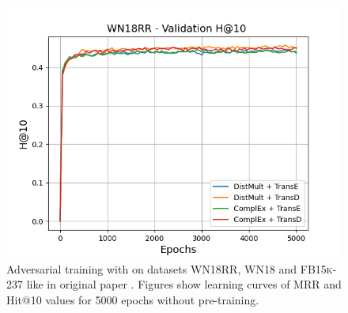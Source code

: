 \begin{figure}
\begin{minipage}{.3\textwidth}
      \includegraphics[width=0.9\linewidth]{figures/results/gan_train/not_pretrained/uncertainty/max_distribution/entropy/wn18rr/5k_epochs/uncertainty_wn18rr_hit10.png}
    \end{minipage}%
    \caption{Adversarial training with \ussoftmax on datasets \textsc{WN18RR}, \textsc{WN18} and \textsc{FB15k-237} like in original \kbgan paper \cite{cai2017kbgan}.
    Figures show learning curves of MRR and Hit@10 values for 5000 epochs without pre-training.}
    \label{fig:gan_train_not_pretrained_max_distribution}
\end{figure}